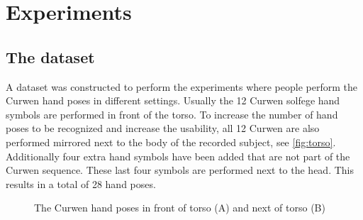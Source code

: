 
\chapter{Experiments}
\label{ch:experiments}


\section{The dataset}
A dataset was constructed to perform the experiments where people perform the Curwen hand poses in different settings. Usually the 12 Curwen solfege hand symbols are performed in front of the torso. To increase the number of hand poses to be recognized and increase the usability, all 12 Curwen are also performed mirrored next to the body of the recorded subject, see \autoref{fig:torso}. Additionally four extra hand symbols have been added that are not part of the Curwen sequence. These last four symbols are performed next to the head. This results in a total of 28 hand poses.

\begin{figure}[htbp]
  \centering
\hspace{0.03\linewidth}
  \caption{The Curwen hand poses in front of torso (A) and next of torso (B)}
  \label{fig:torso}
\end{figure}


